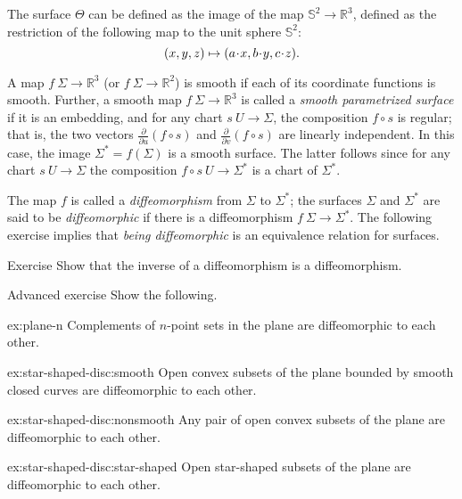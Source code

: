 The surface $\Theta$ can be defined as the image of the map $ \mathbb{S}^2\to\mathbb{R}^3$, defined as the restriction of the following map to the unit sphere $\mathbb{S}^2$:
\[(x,y,z)\z\mapsto (a\cdot x, b\cdot y,c\cdot z).\]


A map $f\:\Sigma \to \mathbb{R}^3$ (or $f\:\Sigma \to \mathbb{R}^2$) is smooth if each of its coordinate functions is smooth.
Further, a smooth map $f \: \Sigma \to \mathbb{R}^3$ is called a 
\emph{smooth parametrized surface} if it is an embedding, and for any chart $s \:U\to \Sigma$,
the composition $f\circ s$ is regular;
that is,  the two vectors 
$\frac{\partial}{\partial u}(f\circ s)$ and $\frac{\partial}{\partial v}(f\circ s)$ are linearly independent.
In this case, the image $\Sigma^{*}=f(\Sigma)$ is a smooth surface.
The latter follows since for any chart $s\:U\to \Sigma$ the composition $f\circ s\:U\to \Sigma^{*}$ is a chart of $\Sigma^{*}$. 

The map $f$ is called a \emph{diffeomorphism} from $\Sigma$ to $\Sigma^{*}$;
the surfaces $\Sigma$ and $\Sigma^{*}$ are said to be {}\emph{diffeomorphic} if there is a diffeomorphism $f\:\Sigma\to\Sigma^{*}$.
The following exercise implies that \textit{being diffeomorphic} is an equivalence relation for surfaces.

\begin{thm}{Exercise}\label{ex:inv-diffeomorphism}
Show that the inverse of a diffeomorphism is a diffeomorphism.
\end{thm}

\begin{thm}{Advanced exercise}\label{ex:star-shaped-disc}
Show the following.

\begin{subthm}{ex:plane-n}
Complements of $n$-point sets in the plane are diffeomorphic to each other.
\end{subthm}


\begin{subthm}{ex:star-shaped-disc:smooth}
Open convex subsets of the plane bounded by smooth closed curves are diffeomorphic to each other.
\end{subthm}


\begin{subthm}{ex:star-shaped-disc:nonsmooth}
Any pair of open convex subsets of the plane are diffeomorphic to each other.
\end{subthm}

\begin{subthm}{ex:star-shaped-disc:star-shaped}
Open star-shaped subsets of the plane are diffeomorphic to each other.
\end{subthm}
\end{thm}

